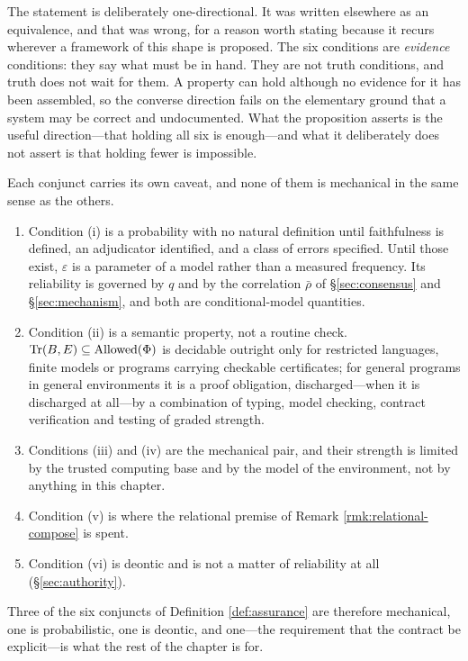 The statement is deliberately one-directional. It was written elsewhere as an equivalence, and
that was wrong, for a reason worth stating because it recurs wherever a framework of this shape is
proposed. The six conditions are \emph{evidence} conditions: they say what must be in hand. They are
not truth conditions, and truth does not wait for them. A property can hold although no evidence for
it has been assembled, so the converse direction fails on the elementary ground that a system may be
correct and undocumented. What the proposition asserts is the useful direction---that holding all six
is enough---and what it deliberately does not assert is that holding fewer is impossible.

Each conjunct carries its own caveat, and none of them is mechanical in the same sense as the
others.
\begin{enumerate}[label=(\alph*)]
\item Condition (i) is a probability with no natural definition until faithfulness is defined, an
      adjudicator identified, and a class of errors specified. Until those exist, $\varepsilon$ is a
      parameter of a model rather than a measured frequency. Its reliability is governed by $q$ and
      by the correlation $\bar\rho$ of \S\ref{sec:consensus} and \S\ref{sec:mechanism}, and both are
      conditional-model quantities.
\item Condition (ii) is a semantic property, not a routine check. $\operatorname{Tr}(B,E) \subseteq \operatorname{Allowed}(\Phi)$
      is decidable outright only for restricted languages, finite models or programs carrying
      checkable certificates; for general programs in general environments it is a proof obligation,
      discharged---when it is discharged at all---by a combination of typing, model checking,
      contract verification and testing of graded strength.
\item Conditions (iii) and (iv) are the mechanical pair, and their strength is limited by the trusted
      computing base and by the model of the environment, not by anything in this chapter.
\item Condition (v) is where the relational premise of Remark \ref{rmk:relational-compose} is spent.
\item Condition (vi) is deontic and is not a matter of reliability at all (\S\ref{sec:authority}).
\end{enumerate}
Three of the six conjuncts of Definition \ref{def:assurance} are therefore mechanical, one is
probabilistic, one is deontic, and one---the requirement that the contract be explicit---is what the
rest of the chapter is for.


